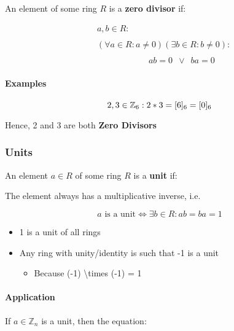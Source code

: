 \documentclass[
]{article}
\begin{document}
\begin{enumerate}
  An element of some ring \(R\) is a \textbf{zero divisor} if:

  \begin{align}
  &a,b \in R: \\
  \ \\
  &(\forall a \in R : a \neq 0) (\exists b \in R : b \neq 0) : \\
  \ \\
  &\qquad \qquad \qquad ab = 0 \enspace \vee \enspace ba = 0
  \end{align}

  \hypertarget{header-n814}{%
  \paragraph{Examples}\label{header-n814}}

  \[2,3 \in \mathbb{Z}_6 : \\
  \ \\
  2 * 3 = [6]_6 = [0]_6\]
\end{enumerate}

Hence, 2 and 3 are both \textbf{Zero Divisors}

\hypertarget{header-n818}{%
\subsubsection{Units}\label{header-n818}}

An element \(a \in R\) of some ring \(R\) is a \textbf{unit} if:

The element always has a multiplicative inverse, i.e.

\[a \text{ is a unit} \iff \exists b \in R : ab = ba =1\]

\begin{itemize}
\item
  1 is a unit of all rings
\item
  Any ring with unity/identity is such that -1 is a unit

  \begin{itemize}
  \item
    Because (-1) \textbackslash times (-1) = 1
  \end{itemize}
\end{itemize}

\hypertarget{header-n830}{%
\paragraph{Application}\label{header-n830}}

If \(a \in \mathbb{Z}_n\) is a unit, then the equation:
\end{document}
